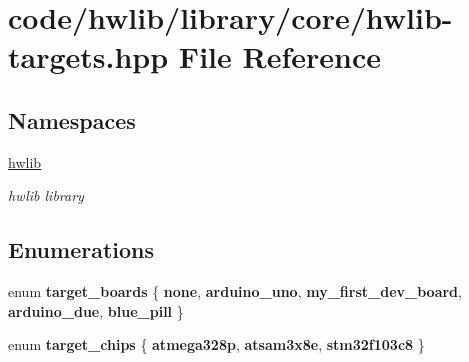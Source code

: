 \hypertarget{hwlib-targets_8hpp}{}\section{code/hwlib/library/core/hwlib-\/targets.hpp File Reference}
\label{hwlib-targets_8hpp}
\subsection*{Namespaces}
\begin{DoxyCompactItemize}
\item 
 \hyperlink{namespacehwlib}{hwlib}
\begin{DoxyCompactList}\small\item\em hwlib library \end{DoxyCompactList}\end{DoxyCompactItemize}
\subsection*{Enumerations}
\begin{DoxyCompactItemize}
\item 
\mbox{\label{namespacehwlib_af5c9bdc7595e5d0d1029b166414de5d8}} 
enum {\bfseries target\+\_\+boards} \{ \newline
{\bfseries none}, 
{\bfseries arduino\+\_\+uno}, 
{\bfseries my\+\_\+first\+\_\+dev\+\_\+board}, 
{\bfseries arduino\+\_\+due}, 
\newline
{\bfseries blue\+\_\+pill}
 \}
\item 
\mbox{\label{namespacehwlib_ae17c8e1a280dac488d48368105c79b12}} 
enum {\bfseries target\+\_\+chips} \{ {\bfseries atmega328p}, 
{\bfseries atsam3x8e}, 
{\bfseries stm32f103c8}
 \}
\end{DoxyCompactItemize}
